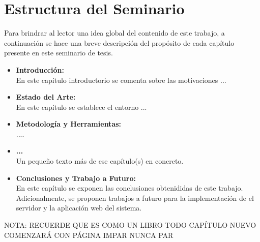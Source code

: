 \section{Estructura del Seminario}

Para brindrar al lector una idea global del contenido de este trabajo, a continuación se hace una breve descripción del propósito de cada capítulo presente en este seminario de tesis.
\begin{itemize}

\item \textbf{Introducción:} \\
En este capítulo introductorio se comenta sobre las motivaciones ...

\item \textbf{Estado del Arte:} \\
En este capítulo se establece el entorno ...

\item \textbf{Metodología y Herramientas:} \\
....

\item \textbf{...} \\
Un pequeño texto más de ese capítulo(s) en concreto.

\item \textbf{Conclusiones y Trabajo a Futuro:}\\
En este capítulo se exponen las conclusiones obtenididas de este trabajo. Adicionalmente, se proponen trabajos a futuro para la implementación de el servidor y la aplicación web del sistema.
\end{itemize}

NOTA: RECUERDE QUE ES COMO UN LIBRO TODO CAPÍTULO NUEVO COMENZARÁ CON PÁGINA IMPAR NUNCA PAR


